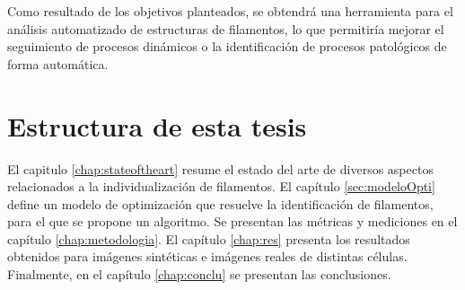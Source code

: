 
Como resultado de los objetivos planteados, se obtendr\'a una herramienta para el an\'alisis automatizado de estructuras de filamentos, lo que permitir\'ia mejorar el seguimiento de procesos din\'amicos o la identificaci\'on de procesos patol\'ogicos de forma autom\'atica.

\section*{Estructura de esta tesis}
El capitulo \ref{chap:stateoftheart} resume el estado del arte de diversos aspectos relacionados a la individualizaci\'on de filamentos. El cap\'itulo \ref{sec:modeloOpti} define un modelo de optimizaci\'on que resuelve la identificaci\'on de filamentos, para el que se propone un algoritmo. Se presentan las m\'etricas y mediciones en el cap\'itulo \ref{chap:metodologia}. El cap\'itulo \ref{chap:res} presenta los resultados obtenidos para im\'agenes sint\'eticas e im\'agenes reales de distintas c\'elulas. Finalmente, en el cap\'itulo \ref{chap:conclu} se presentan las conclusiones.

